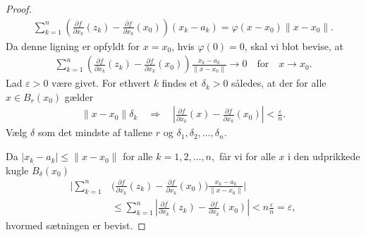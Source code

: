 \begin{proof}
\begin{align*}
     \sum_{k = 1}^n \left( \frac{\partial f}{\partial x_k}(z_k) - \frac{\partial f}{\partial x_k}(x_0) \right) (x_k - a_k) =
     \varphi(x - x_0) \| x -x_0 \|.
   \end{align*}
   Da denne ligning er opfyldt for $x = x_0$, hvis $\varphi(0) = 0$, skal vi blot bevise, at
   \begin{align*}
     \sum_{k = 1}^n \left( \frac{\partial f}{\partial x_k}(z_k) - \frac{\partial f}{\partial x_k}(x_0) \right) \frac{x_k - a_k}{\| x - x_0 \|} \rightarrow 0 \quad \text{for} \quad x \rightarrow x_0.
   \end{align*}
   Lad $\varepsilon > 0$ være givet. For ethvert $k$ findes et $\delta_k > 0$ således, at der for alle $x \in B_r(x_0)$ gælder
   \begin{align*}
     \| x - x_0 \| \delta_k \quad \Rightarrow \quad \left| \frac{\partial f}{\partial x_k}(x) - \frac{\partial f}{\partial x_k}(x_0) \right| < \frac{\varepsilon}{n}.
   \end{align*}
   Vælg $\delta$ som det mindste af tallene $r$ og $\delta_1, \delta_2, \ldots, \delta_n.$

   Da $|x_k - a_k| \leq \| x - x_0 \|$ for alle $k = 1,2, \ldots, n,$ får vi for alle $x$ i den udprikkede kugle $\dot{B}_\delta (x_0)$
   \begin{align*}
     \bigg| \sum_{k = 1}^n &\bigg( \frac{\partial f}{\partial x_k}(z_k) - \frac{\partial f}{\partial x_k}(x_0) \bigg) \frac{x_k - a_k}{\| x - x_0 \|} \bigg| \\
     &\leq \sum_{k = 1}^n \left|\frac{\partial f}{\partial x_k}(z_k) - \frac{\partial f}{\partial x_k}(x_0)\right| < n\frac{\varepsilon}{n} = \varepsilon,
   \end{align*}
   hvormed sætningen er bevist.
\end{proof}
